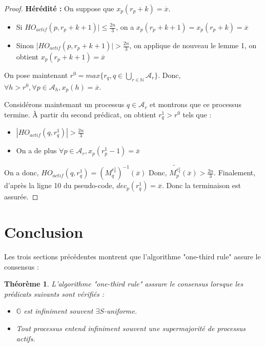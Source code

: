 \documentclass{article}
\newtheorem{theorem}{Théorème}
\begin{document}
\begin{proof}
	\textbf{Hérédité :}
	On suppose que $x_p(r_p+k) = \overline{x}$.
	\begin{itemize}

		\item Si $HO_{actif}(p,r_p+k+1)| \leq \frac{2 n}{3}$, on a $x_p(r_p+k+1) = x_p(r_p+k) = \overline{x}$
		\item Sinon |$HO_{actif}(p,r_p+k+1)| > \frac{2 n}{3}$, on applique de nouveau le lemme 1, on obtient $x_p(r_p+k+1) = \overline{x}$

	\end{itemize}

	On pose maintenant $r^0 = max \{r_q, q \in \bigcup\limits_{r \in \mathds{N}} \mathcal{A}_r\}$.
	Donc, $\forall h > r^0, \forall p \in \mathcal{A}_h, x_p(h) = \overline{x}$.

	Considérons maintemant un processus $q \in \mathcal{A}_r$ et montrons que ce processus termine.
	À partir du second prédicat, on obtient $r^1_q > r^0$ tels que :
	\begin{itemize}

		\item $|HO_{actif}(q, r^1_q)| > \frac{2 n}{3}$
		\item On a de plus $\forall p \in \mathcal{A}_r, x_p(r_p^1-1) = \overline{x}$

	\end{itemize}

	On a donc, $HO_{actif}(q,r^1_q) = (M_q^{r_q^1})^{-1}(\overline{x}) $
	Donc, $ \widetilde{M_p^{r_q^1}}(\overline{x}) > \frac{2 n}{3} $.
	Finalement, d'après la ligne 10 du pseudo-code, $dec_p(r_q^1) = \overline{x}$.
	Donc la terminaison est assurée.

\end{proof}

\section{Conclusion}

Les trois sections précédentes montrent que l'algorithme "one-third rule" assure le consensus :

	\begin{theorem}

		 L'algorithme "one-third rule" asssure le consensus lorsque les prédicats suivants sont vérifiés :
		\begin{itemize}
			\item $\mathds{G}$ est infiniment souvent $\exists S $-uniforme.
			\item Tout processus entend infiniment souvent une supermajorité de processus actifs.
		\end{itemize}
	\end{theorem}
\end{document}
